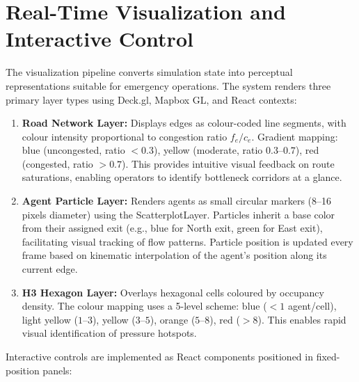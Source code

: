 \documentclass[12pt,a4paper,oneside]{report}
\begin{document}
\section{Real-Time Visualization and Interactive Control}

The visualization pipeline converts simulation state into perceptual representations suitable for emergency operations. The system renders three primary layer types using Deck.gl, Mapbox GL, and React contexts:

\begin{enumerate}
    \item \textbf{Road Network Layer:} Displays edges as colour-coded line segments, with colour intensity proportional to congestion ratio $f_e / c_e$. Gradient mapping: blue (uncongested, ratio $< 0.3$), yellow (moderate, ratio $0.3$--$0.7$), red (congested, ratio $> 0.7$). This provides intuitive visual feedback on route saturations, enabling operators to identify bottleneck corridors at a glance.
    
    \item \textbf{Agent Particle Layer:} Renders agents as small circular markers (8--16 pixels diameter) using the ScatterplotLayer. Particles inherit a base color from their assigned exit (e.g., blue for North exit, green for East exit), facilitating visual tracking of flow patterns. Particle position is updated every frame based on kinematic interpolation of the agent's position along its current edge.
    
    \item \textbf{H3 Hexagon Layer:} Overlays hexagonal cells coloured by occupancy density. The colour mapping uses a 5-level scheme: blue ($< 1$ agent/cell), light yellow ($1$--$3$), yellow ($3$--$5$), orange ($5$--$8$), red ($> 8$). This enables rapid visual identification of pressure hotspots.
\end{enumerate}

Interactive controls are implemented as React components positioned in fixed-position panels:
\end{document}
